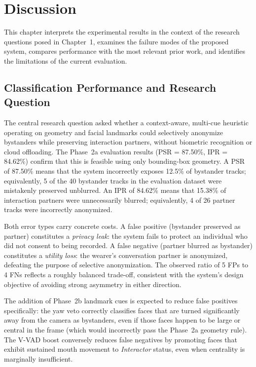 \chapter{Discussion}
\label{sec:discussion}

This chapter interprets the experimental results in the context of the research
questions posed in Chapter~1, examines the failure modes of the proposed system,
compares performance with the most relevant prior work, and identifies the
limitations of the current evaluation.

\section{Classification Performance and Research Question}
\label{sec:disc_perf}

The central research question asked whether a context-aware, multi-cue heuristic
operating on geometry and facial landmarks could selectively anonymize bystanders
while preserving interaction partners, without biometric recognition or cloud
offloading. The Phase~2a evaluation results (PSR = 87.50\%, IPR = 84.62\%) confirm
that this is feasible using only bounding-box geometry. A PSR of 87.50\% means that
the system incorrectly exposes 12.5\% of bystander tracks; equivalently, 5 of the
40 bystander tracks in the evaluation dataset were mistakenly preserved unblurred.
An IPR of 84.62\% means that 15.38\% of interaction partners were unnecessarily
blurred; equivalently, 4 of 26 partner tracks were incorrectly anonymized.

Both error types carry concrete costs. A false positive (bystander preserved as
partner) constitutes a \emph{privacy leak}: the system fails to protect an
individual who did not consent to being recorded. A false negative (partner blurred
as bystander) constitutes a \emph{utility loss}: the wearer's conversation partner
is anonymized, defeating the purpose of selective anonymization. The observed ratio
of 5 FPs to 4 FNs reflects a roughly balanced trade-off, consistent with the
system's design objective of avoiding strong asymmetry in either direction.

The addition of Phase~2b landmark cues is expected to reduce false positives
specifically: the yaw veto correctly classifies faces that are turned significantly
away from the camera as bystanders, even if those faces happen to be large or
central in the frame (which would incorrectly pass the Phase~2a geometry rule). The
V-VAD boost conversely reduces false negatives by promoting faces that exhibit
sustained mouth movement to \emph{Interactor} status, even when centrality is
marginally insufficient.

